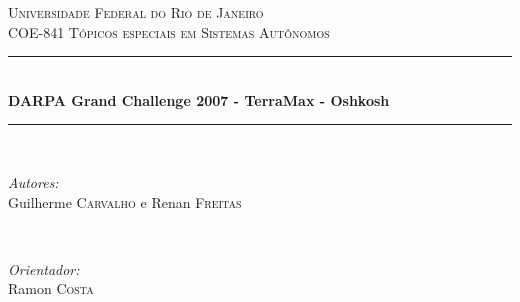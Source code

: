 \documentclass[12pt]{article}
\begin{document}
\begin{titlepage}

\newcommand{\HRule}{\rule{\linewidth}{0.5mm}} %

\center %


\textsc{\LARGE Universidade Federal do Rio de Janeiro}\\[1.5cm]
\textsc{\Large COE-841 Tópicos especiais em Sistemas Autônomos}\\[0.5cm] %


\HRule \\[0.4cm]
{ \huge \bfseries DARPA Grand Challenge 2007 -  TerraMax - Oshkosh}\\[0.4cm] %
\HRule \\[1.5cm]


\begin{minipage}{0.4\textwidth}
\begin{flushleft} \large
\emph{Autores:}\\
Guilherme \textsc{Carvalho} e Renan \textsc{Freitas}
\end{flushleft}
\end{minipage}
~
\begin{minipage}{0.4\textwidth}
\begin{flushright} \large
\emph{Orientador:} \\
Ramon \textsc{Costa}
\end{flushright}
\end{minipage}\\[2cm]



\end{titlepage}
\end{document}
